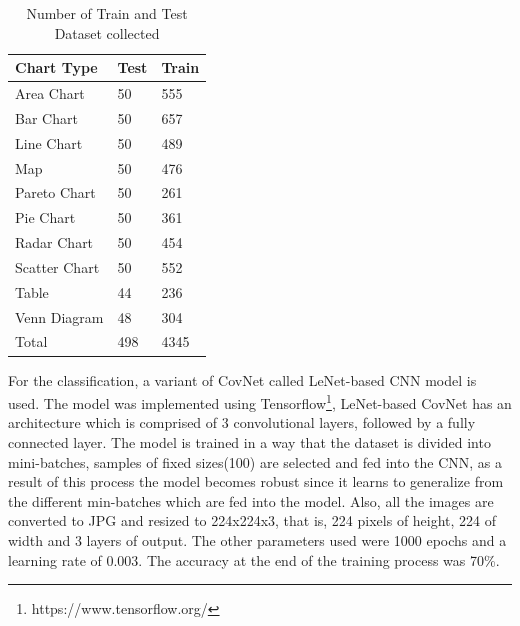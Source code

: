 \documentclass[12pt, a4paper,oneside]{report}
\begin{document}
\begin{table}[h]
	\centering {} \small
	\begin{tabular}{|p{5cm}|p{3cm}|p{3cm}|}
		
		\hline
		Chart Type & Test & Train \\ \hline
		Area Chart & 50 & 555 \\ \hline
		Bar Chart & 50 & 657 \\ \hline
		Line Chart & 50 & 489 \\ \hline
		Map & 50 & 476 \\ \hline
		Pareto Chart & 50 & 261 \\ \hline	
		Pie Chart & 50 & 361 \\ \hline
		Radar Chart & 50 & 454 \\ \hline
		Scatter Chart & 50 & 552 \\ \hline
		Table & 44 & 236 \\ \hline
		Venn Diagram & 48 & 304 \\ \hline
		Total & 498 & 4345 \\ \hline
		
	\end{tabular}
	\caption {Number of Train and Test Dataset collected}	
	\label{table:rela}
	
\end{table}
For the classification, a variant of CovNet called LeNet-based CNN model is used. The model was implemented using Tensorflow\footnote{https://www.tensorflow.org/}, LeNet-based CovNet has an architecture which is comprised of 3 convolutional layers, followed by a fully connected layer. The model is trained in a way that the dataset is divided into mini-batches, samples of fixed sizes(100) are selected and fed into the CNN, as a result of this process the model becomes robust since it learns to generalize from the different min-batches which are fed into the model. Also, all the images are converted to JPG and resized to 224x224x3, that is, 224 pixels of height, 224 of width and 3 layers of output. The other parameters used were 1000 epochs and a learning rate of 0.003. The accuracy at the end of the training process was 70\%.
\end{document}

